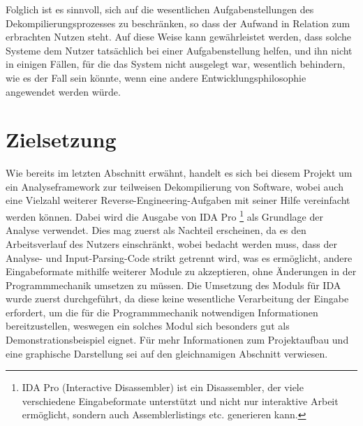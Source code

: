\documentclass[11pt]{article}
\begin{document}
Folglich ist es sinnvoll, sich auf die wesentlichen Aufgabenstellungen des Dekompilierungsprozesses
zu beschränken, so dass der Aufwand in Relation zum erbrachten Nutzen steht. Auf diese Weise kann
gewährleistet werden, dass solche Systeme dem Nutzer tatsächlich bei einer Aufgabenstellung helfen,
und ihn nicht in einigen Fällen, für die das System nicht ausgelegt war, wesentlich behindern, wie es
der Fall sein könnte, wenn eine andere Entwicklungsphilosophie angewendet werden würde.

\section{Zielsetzung} Wie bereits im letzten Abschnitt erwähnt, handelt es sich bei diesem Projekt
um ein Analyseframework zur teilweisen Dekompilierung von Software, wobei auch eine Vielzahl
weiterer Reverse-Engineering-Aufgaben mit seiner
Hilfe vereinfacht werden können. Dabei wird die Ausgabe von IDA Pro
\footnote{IDA Pro (Interactive Disassembler)
	ist ein Disassembler, der
	viele verschiedene Eingabeformate unterstützt und nicht nur interaktive Arbeit ermöglicht, sondern
	auch Assemblerlistings etc. generieren kann.}
als Grundlage der Analyse verwendet. Dies mag zuerst
als Nachteil erscheinen, da es den Arbeitsverlauf des Nutzers einschränkt, wobei bedacht werden
muss, dass der Analyse- und Input-Parsing-Code strikt getrennt wird, was es ermöglicht, andere
Eingabeformate mithilfe weiterer Module zu akzeptieren, ohne Änderungen in der Programmmechanik
umsetzen zu müssen. Die Umsetzung des Moduls für IDA wurde zuerst durchgeführt, da diese keine
wesentliche Verarbeitung der Eingabe erfordert, um die für die Programmmechanik notwendigen
Informationen bereitzustellen, weswegen ein solches Modul sich besonders gut als
Demonstrationsbeispiel eignet. Für mehr Informationen zum Projektaufbau und eine graphische
Darstellung sei auf den gleichnamigen Abschnitt verwiesen.
\end{document}
